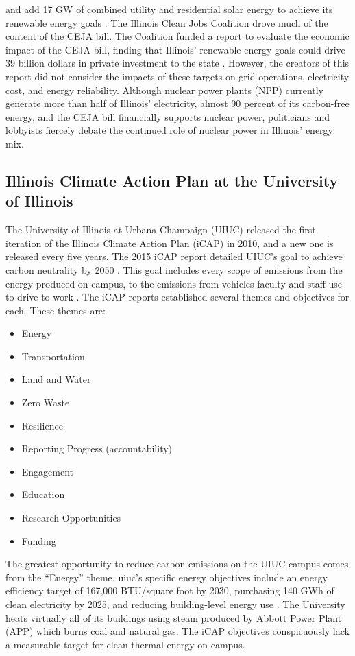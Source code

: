 and add 17 GW of combined utility and residential solar energy
to achieve its renewable energy goals \cite{goeller_new_2021, the_accelerate_group_clean_2019}.
The Illinois Clean Jobs Coalition
drove much of the content of the CEJA bill. The Coalition funded a report to
evaluate the economic impact of the CEJA bill, finding that Illinois’ renewable
energy goals could drive 39 billion dollars in private investment to the state
\cite{the_accelerate_group_clean_2019}.
However, the creators of this report did not consider the impacts of these targets
on grid operations, electricity cost, and energy reliability. Although nuclear power
plants (NPP) currently generate more than half of Illinois’ electricity, almost
90 percent of its carbon-free energy, and the CEJA bill financially supports nuclear
power, politicians and lobbyists fiercely debate the continued role of nuclear power
in Illinois’ energy mix.

\subsection{Illinois Climate Action Plan at the University of Illinois}

The University of Illinois at Urbana-Champaign (UIUC) released the first iteration
of the Illinois Climate Action Plan (iCAP) in 2010, and a new one is released every five years.
The 2015 iCAP report detailed UIUC’s goal to achieve carbon neutrality by 2050
\cite{institute_for_sustainability_energy_and_environment_illinois_2015}.
This goal includes every scope of emissions from the energy produced on campus, to
the emissions from vehicles faculty and staff use to drive to work
\cite{institute_for_sustainability_energy_and_environment_illinois_2015,
institute_for_sustainability_energy_and_environment_illinois_2020}. The
iCAP reports established several themes and objectives for each. These themes are:
\begin{itemize}
  \item Energy
  \item Transportation
  \item Land and Water
  \item Zero Waste
  \item Resilience
  \item Reporting Progress (accountability)
  \item Engagement
  \item Education
  \item Research Opportunities
  \item Funding
\end{itemize}
The greatest opportunity to reduce carbon emissions on the UIUC campus comes from
the ``Energy” theme. \gls{uiuc}’s specific energy objectives include an energy
efficiency target of 167,000 BTU/square foot by 2030, purchasing 140 GWh of clean
electricity by 2025, and reducing building-level energy use
\cite{institute_for_sustainability_energy_and_environment_illinois_2020}. The University
heats virtually all of its buildings using steam produced by Abbott Power Plant
(APP) which burns coal and natural gas. The iCAP objectives conspicuously lack a
measurable target for clean thermal energy on campus.

